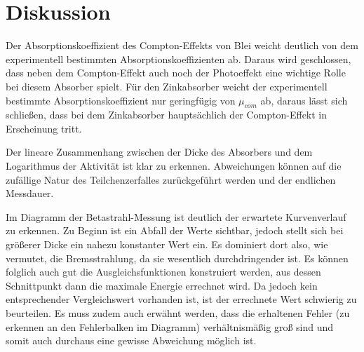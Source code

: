 \section{Diskussion}
\label{sec:Diskussion}

Der Absorptionskoeffizient des Compton-Effekts von Blei weicht deutlich von dem experimentell bestimmten Absorptionskoeffizienten ab.
Daraus wird geschlossen, dass neben dem Compton-Effekt auch noch der Photoeffekt eine wichtige Rolle bei diesem Absorber spielt. Für
den Zinkabsorber weicht der experimentell bestimmte Absorptionskoeffizient nur geringfügig von $\mu_{com}$ ab, daraus
lässt sich schließen, dass bei dem Zinkabsorber hauptsächlich der Compton-Effekt in Erscheinung tritt.

Der lineare Zusammenhang zwischen der Dicke des Absorbers und dem Logarithmus der Aktivität ist klar zu erkennen.
Abweichungen können auf die zufällige Natur des Teilchenzerfalles zurückgeführt werden und der endlichen Messdauer.

Im Diagramm der Betastrahl-Messung ist deutlich der erwartete Kurvenverlauf zu erkennen. Zu Beginn ist ein Abfall der
Werte sichtbar, jedoch stellt sich bei größerer Dicke ein nahezu konstanter Wert ein. Es dominiert dort also, wie vermutet, die Bremsstrahlung, da
sie wesentlich durchdringender ist. Es können folglich auch gut die Ausgleichsfunktionen konstruiert werden, aus dessen Schnittpunkt
dann die maximale Energie errechnet wird. Da jedoch kein entsprechender Vergleichswert vorhanden ist, ist der errechnete Wert schwierig
zu beurteilen. Es muss zudem auch erwähnt werden, dass die erhaltenen Fehler (zu erkennen an den Fehlerbalken im Diagramm) verhältnismäßig
groß sind und somit auch durchaus eine gewisse Abweichung möglich ist.
